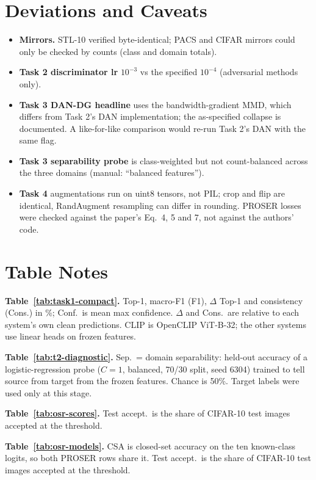 \documentclass{article}
\newenvironment{tight}{\begin{itemize}\setlength{\itemsep}{0pt}\setlength{\parsep}{0pt}\setlength{\topsep}{2pt}\setlength{\parskip}{0pt}}{\end{itemize}}
\begin{document}
\section{Deviations and Caveats}
\label{app:deviations}
\begin{tight}

\item \textbf{Mirrors.} STL-10 verified byte-identical; PACS and CIFAR mirrors could only be checked by counts (class and domain totals).
\item \textbf{Task 2 discriminator lr} $10^{-3}$ vs the specified $10^{-4}$ (adversarial methods only).
\item \textbf{Task 3 DAN-DG headline} uses the bandwidth-gradient MMD, which differs from Task 2's DAN implementation; the as-specified collapse is documented. A like-for-like comparison would re-run Task 2's DAN with the same flag.
\item \textbf{Task 3 separability probe} is class-weighted but not count-balanced across the three domains (manual: ``balanced features'').
\item \textbf{Task 4} augmentations run on uint8 tensors, not PIL; crop and flip are identical, RandAugment resampling can differ in rounding. PROSER losses were checked against the paper's Eq.\ 4, 5 and 7, not against the authors' code.
\end{tight}

\section{Table Notes}

\textbf{Table~\ref{tab:task1-compact}.} Top-1, macro-F1 (F1), $\Delta$ Top-1 and consistency (Cons.) in \%; Conf.\ is mean
  max confidence. $\Delta$ and Cons.\ are relative to each system's own clean predictions. CLIP is
  OpenCLIP ViT-B-32; the other systems use linear heads on frozen features.

\textbf{Table~\ref{tab:t2-diagnostic}.} Sep.\ = domain separability: held-out accuracy of a logistic-regression probe
  ($C=1$, balanced, 70/30 split, seed 6304) trained to tell source from target from the frozen
  features. Chance is 50\%. Target labels were used only at this stage.

\textbf{Table~\ref{tab:osr-scores}.} Test accept.\ is the share of CIFAR-10 test images accepted at the threshold.

\textbf{Table~\ref{tab:osr-models}.} CSA is closed-set accuracy on the ten known-class logits, so both PROSER rows share
  it. Test accept.\ is the share of CIFAR-10 test images accepted at the threshold.
\end{document}
